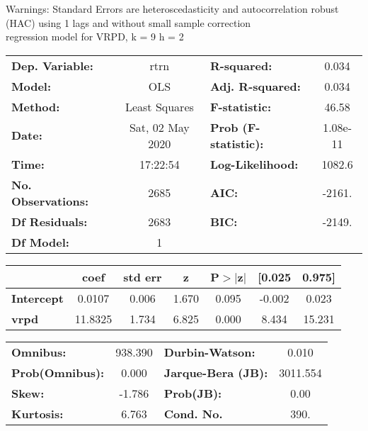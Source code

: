 Warnings: \newline
 [1] Standard Errors are heteroscedasticity and autocorrelation robust (HAC) using 1 lags and without small sample correction\\ 

regression model for VRPD, k = 9 h = 2\begin{center}
\begin{tabular}{lclc}
\toprule
\textbf{Dep. Variable:}    &       rtrn       & \textbf{  R-squared:         } &     0.034   \\
\textbf{Model:}            &       OLS        & \textbf{  Adj. R-squared:    } &     0.034   \\
\textbf{Method:}           &  Least Squares   & \textbf{  F-statistic:       } &     46.58   \\
\textbf{Date:}             & Sat, 02 May 2020 & \textbf{  Prob (F-statistic):} &  1.08e-11   \\
\textbf{Time:}             &     17:22:54     & \textbf{  Log-Likelihood:    } &    1082.6   \\
\textbf{No. Observations:} &        2685      & \textbf{  AIC:               } &    -2161.   \\
\textbf{Df Residuals:}     &        2683      & \textbf{  BIC:               } &    -2149.   \\
\textbf{Df Model:}         &           1      & \textbf{                     } &             \\
\bottomrule
\end{tabular}
\begin{tabular}{lcccccc}
                   & \textbf{coef} & \textbf{std err} & \textbf{z} & \textbf{P$> |$z$|$} & \textbf{[0.025} & \textbf{0.975]}  \\
\midrule
\textbf{Intercept} &       0.0107  &        0.006     &     1.670  &         0.095        &       -0.002    &        0.023     \\
\textbf{vrpd}      &      11.8325  &        1.734     &     6.825  &         0.000        &        8.434    &       15.231     \\
\bottomrule
\end{tabular}
\begin{tabular}{lclc}
\textbf{Omnibus:}       & 938.390 & \textbf{  Durbin-Watson:     } &    0.010  \\
\textbf{Prob(Omnibus):} &   0.000 & \textbf{  Jarque-Bera (JB):  } & 3011.554  \\
\textbf{Skew:}          &  -1.786 & \textbf{  Prob(JB):          } &     0.00  \\
\textbf{Kurtosis:}      &   6.763 & \textbf{  Cond. No.          } &     390.  \\
\bottomrule
\end{tabular}
\end{center}

